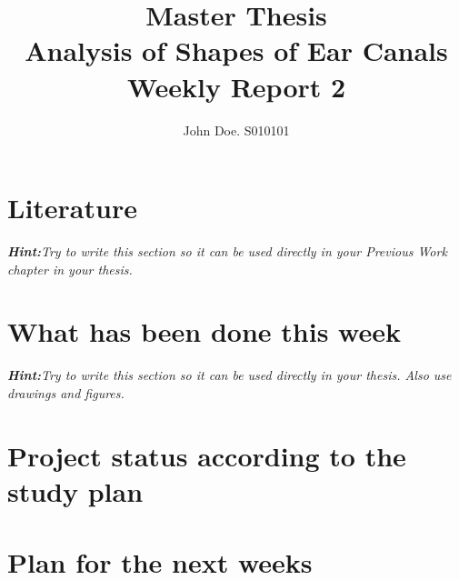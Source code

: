\documentclass[10pt,a4paper]{article}
\title{{Master Thesis\\[0.5em]}
       {\bf \huge Analysis of Shapes of Ear Canals\\[0.5em]}
       {\bf Weekly Report 2}}
\author{John Doe. S010101}
\begin{document}
\maketitle

\section*{Literature}

\textit{\textbf{Hint:}Try to write this section so it can be used
  directly in your Previous Work chapter in your thesis.}


\section*{What has been done this week}

\textit{\textbf{Hint:}Try to write this section so it can be used
  directly in your thesis. Also use drawings and figures.}

\section*{Project status according to the study plan}

\section*{Plan for the next weeks}

 

\end{document}
